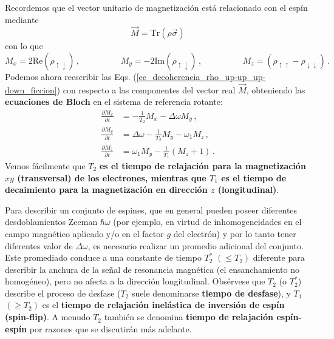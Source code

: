 \documentclass[a4paper,11pt]{book} %
\numberwithin{equation}{chapter}
\def\lp{\left(}
\def\rp{\right)}
\begin{document}
Recordemos que el vector unitario de magnetización está relacionado con el espín mediante
	\begin{equation}
	\vec{M} = \text{Tr} \lp \rho \vec{\sigma} \rp
	\end{equation}
con lo que
	\begin{equation}
	M_x = 2 \text{Re} (\rho_{\uparrow \downarrow})\, , \hspace{2cm}
	M_y = -2 \text{Im}(\rho_{\uparrow \downarrow}) \, , \hspace{2cm}	
	M_z = (\rho_{\uparrow \uparrow} - \rho_{\downarrow \downarrow}) \,.
	\end{equation}
Podemos ahora reescribir las Eqs. (\ref{ec_decoherencia_rho_up-up_up-down_ficcion}) con respecto a las componentes del vector real $\vec{M}$, obteniendo las \textbf{ecuaciones de Bloch} en el sistema de referencia rotante:
	\begin{equation} 
\begin{aligned}
	\frac{\partial M_x}{\partial t} & = - \frac{1}{T_2} M_x - \Delta\omega M_y \, , \\
	\frac{\partial M_y}{\partial t} & = \Delta\omega - \frac{1}{T_2} M_y - \omega_1 M_z\, , \\
	\frac{\partial M_z}{\partial t} & = \omega_1 M_y - \frac{1}{T_1} (M_z +1) \, .
	\end{aligned}
\end{equation}
Vemos fácilmente que $T_2$ \textbf{es el tiempo de relajación para la magnetización $xy$ (transversal) de los electrones, mientras que $T_1$ es el tiempo de decaimiento para la magnetización en dirección $z$ (longitudinal)}. 

Para describir un conjunto de espines, que en general pueden poseer diferentes desdoblamientos Zeeman $\hbar \omega$ (por ejemplo, en virtud de inhomogeneidades en el campo magnético aplicado y/o en el factor $g$ del electrón) y por lo tanto tener diferentes valor de $\Delta\omega$, es necesario realizar un promedio adicional del conjunto. Este promediado conduce a una constante de tiempo $T^{*}_2$ $(\leq T_2)$ diferente para describir la anchura de la señal de resonancia magnética (el ensanchamiento no homogéneo), pero no afecta a la dirección longitudinal. Obsérvese que $T_2$ (o $T^{*}_2$) describe el proceso de desfase ($T_2$ suele denominarse \textbf{tiempo de desfase}), y $T_1$ $(\geq  T_2)$ es el \textbf{tiempo de relajación inelástica de inversión de espín (spin-flip)}. A menudo $T_2$ también se denomina \textbf{tiempo de relajación espín-espín} por razones que se discutirán más adelante. 
\end{document}
